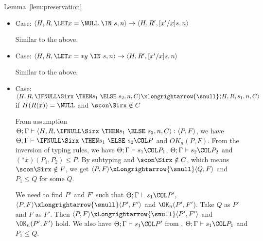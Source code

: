 \begin{pfof}{Lemma~\ref{lem:preservation}}
\begin{itemize}
  We need to find \(P'\) and \(F'\) such that \(\Theta; \Gamma,x',y
  \vdash [x'/x]s : P'\) , \( \langle P, F \rangle \rightarrow \langle
  P', F' \rangle\) and \(\OK_n(P', F'\)). Take \(Q\) as \(P'\) and
  \(F\) as \(F'\). Then \( \langle P,F \rangle \Longrightarrow \langle
  P', F' \rangle\) and \(\OK_n(P', F')\) hold. From \(\Theta; \Gamma,
  x,y \vdash s\COL P''\) and \( \LET x = y\; \IN P'' \le P\), we have
  \(\Theta; \Gamma, x'',y \vdash [x''/x]s : [x''/x]P''\) and \( \LET
  x'' = y\; \IN [x''/x]P'' \le P\), and then by subtying we have
  \([x''/x]P'' \le Q'\) for some \(Q'\). Therefore, we have \(\Theta;
  \Gamma, x'',y \vdash [x''/x]s : Q'\). Take \(x''\) as \(x'\) and
  \(Q'\) as \(P'\), then \(\Theta; \Gamma,x',y \vdash [x'/x]s : P'\)
  holds.
  
\item Case: \( \langle H, R, \LET x = \NULL \ \IN \ s, n\rangle
  \rightarrow \langle H, R', [x'/x]s, n \rangle \)

  Similar to the above.

\item Case: \( \langle H, R, \LET x = *y \ \IN \ s, n\rangle
  \rightarrow \langle H, R', [x'/x]s, n\rangle \)

  Similar to the above.

\item Case: \(\langle H, R, \IFNULL \Sirx \ \THEN s_{1} \ \ELSE
  \ s_{2}, n, C\rangle \xlongrightarrow{\snull} \langle H, R, s_{1}, n, C \rangle\)
  if \(H(R(x)) = \NULL\) and \(\scon\Sirx \notin C\)

  From assumption \( \Theta; \Gamma \vdash \langle H, R, \IFNULL\Sirx
  \ \THEN s_{1} \ \ELSE \ s_{2}, n, C \rangle : \langle P, F
  \rangle\), we have \(\Theta; \Gamma \vdash \IFNULL\Sirx \ \THEN
  s_{1} \ \ELSE \ s_{2} \COL P \) and \(OK_n(P, F)\). From the
  inversion of typing rules, we have \(\Theta; \Gamma \vdash s_{1}
  \COL P_1\), \(\Theta; \Gamma \vdash s_{2} \COL P_2\) and \((*x)(P_1,
  P_2) \le P\). By subtyping and \(\scon\Sirx \notin C\), which means
  \(\scon\Sirx \notin F\), we get \(\langle P, F \rangle \xLongrightarrow{\snull}
  \langle Q, F \rangle \) and \(P_1 \le Q\) for some \(Q\).

  We need to find \(P'\) and \(F'\) such that \(\Theta;\Gamma \vdash
  s_1\COL P'\), \( \langle P, F \rangle \xLongrightarrow{\snull}
  \langle P', F' \rangle\) and \(\OK_n(P', F'\)). Take \(Q\) as \(P'\)
  and \(F\) as \(F'\). Then \( \langle P,F \rangle
  \xLongrightarrow{\snull} \langle P', F' \rangle\) and \(\OK_n(P',
  F')\) hold.  We also have \(\Theta; \Gamma \vdash s_1 \COL P'\) from
  , \(\Theta; \Gamma \vdash s_1 \COL P_1\) and \( P_1 \le
  Q\).


\end{itemize}
\end{pfof}
